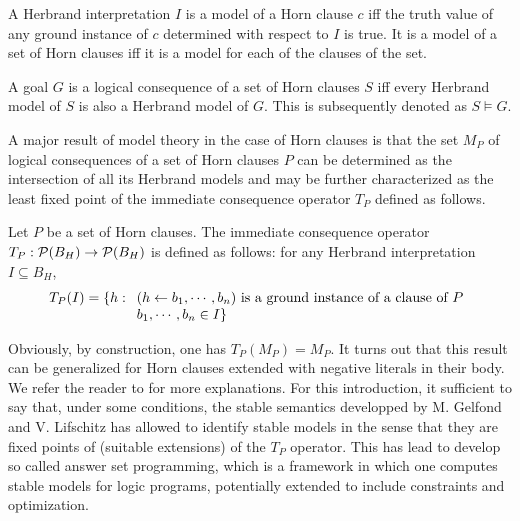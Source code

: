 \begin{definition}
A Herbrand interpretation $I$ is a model of a Horn clause $c$ iff the
truth value of any ground instance of $c$ determined with respect to
$I$ is true. It is a model of a set of Horn clauses iff it is a model
for each of the clauses of the set.
\end{definition}

\begin{definition}
A goal $G$ is a logical consequence of a set of Horn clauses $S$ iff
every Herbrand model of $S$ is also a Herbrand model of $G$. This is
subsequently denoted as $S \models G$.
\end{definition}

A major result of model theory in the case of Horn clauses is that the
set $M_P$ of logical consequences of a set of Horn clauses $P$ can be determined
as the intersection of all its Herbrand models and may be further
characterized as the least fixed point of the immediate consequence
operator $T_P$ defined as follows.

\begin{definition}
Let $P$ be a set of Horn clauses. The immediate consequence operator
$T_P: {\cal P}(B_H) \rightarrow {\cal P}(B_H)$ is defined as follows: for
any Herbrand interpretation $I \subseteq B_H$,
\[ T_P(I) = \{ h : \begin{array}[t]{l}
                  (h \leftarrow b_1, \cdots, b_n) \mbox{ is a ground instance of a clause of } P \\
                  b_1, \cdots, b_n \in I \}
                 \end{array}
\]
\end{definition}

Obviously, by construction, one has $T_P(M_P) = M_P$. It turns out
that this result can be generalized for Horn clauses extended with
negative literals in their body. We refer the reader to \cite{AptBol} for
more explanations. For this introduction, it sufficient to say that,
under some conditions, the stable semantics developped by M. Gelfond
and V. Lifschitz has allowed to identify stable models in the sense
that they are fixed points of (suitable extensions) of the $T_P$
operator. This has lead to develop so called answer set programming,
which is a framework in which one computes stable models for logic
programs, potentially extended to include constraints and optimization.


